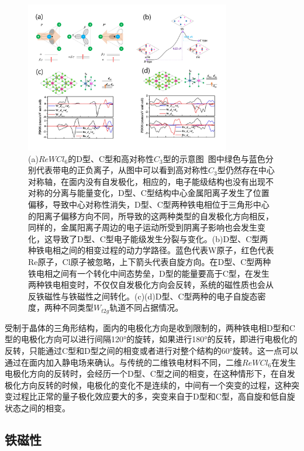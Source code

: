 \begin{figure}[h]
    \centering
\includegraphics[width=0.8\textwidth]{./pic/022.png}
\caption{(a)$ReWCl_{6}$的D型、C型和高对称性$C_{3}$型的示意图\ 图中绿色与蓝色分别代表带电的正负离子，从图中可以看到高对称性$C_{3}$型仍然存在中心对称轴，在面内没有自发极化，相应的，电子能级结构也没有出现不对称的分离与能量变化，D型、C型结构中心金属阳离子发生了位置偏移，导致中心对称性消失，D型、C型两种铁电相位于三角形中心的阳离子偏移方向不同，所导致的这两种类型的自发极化方向相反，同样的，金属阳离子周边的电子运动所受到阴离子影响也会发生变化，这导致了D型、C型电子能级发生分裂与变化。(b)D型、C型两种铁电相之间的相变过程的动力学路径。蓝色代表W原子，红色代表Re原子，Cl原子被忽略，上下箭头代表自旋方向。在D型、C型两种铁电相之间有一个转化中间态势垒，D型的能量要高于C型，在发生两种铁电相变时，不仅仅自发极化方向会反转，系统的磁性质也会从反铁磁性与铁磁性之间转化。(c)(d)D型、C型两种的电子自旋态密度，两种不同类型$W_{t2g}$轨道不同占据情况。}

\label{dog022}
\end{figure}

受制于晶体的三角形结构，面内的电极化方向是收到限制的，两种铁电相D型和C型的电极化方向可以进行间隔120°的旋转，如果进行180°的反转，即进行电极化的反转，只能通过C型和D型之间的相变或者进行对整个结构的60°旋转。这一点可以通过在面内加入静电场来确认。与传统的二维铁电材料不同，二维$ReWCl_{6}$在发生电极化方向的反转时，会经历一个D型、C型之间的相变，在这种情形下，在自发极化方向反转的时候，电极化的变化不是连续的，中间有一个突变的过程，这种突变过程比正常的量子极化效应要大的多，突变来自于D型和C型，高自旋和低自旋状态之间的相变。\cite{WANG20122063}

\subsection{铁磁性}

